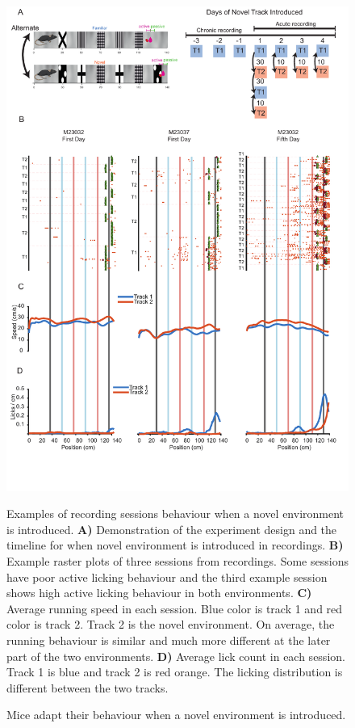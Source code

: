 \begin{figure}
    \centering
    \includegraphics[width=1\linewidth]{figures//Chapter 3 Behaviour//Thesis Figures//figure_PDFs/fig6_novel_track_behaviour_examples.pdf}
    \caption{Mice adapt their behaviour when a novel environment is introduced.}

\medskip
\small
Examples of recording sessions behaviour when a novel environment is introduced. \textbf{A)} Demonstration of the experiment design and the timeline for when novel environment is introduced in recordings. \textbf{B)} Example raster plots of three sessions from recordings. Some sessions have poor active licking behaviour and the third example session shows high active licking behaviour in both environments. \textbf{C)} Average running speed in each session. Blue color is track 1 and red color is track 2. Track 2 is the novel environment. On average, the running behaviour is similar and much more different at the later part of the two environments. \textbf{D)}  Average lick count in each session. Track 1 is blue and track 2 is red orange. The licking distribution is different between the two tracks.  
    \label{fig:placeholder}
\end{figure}